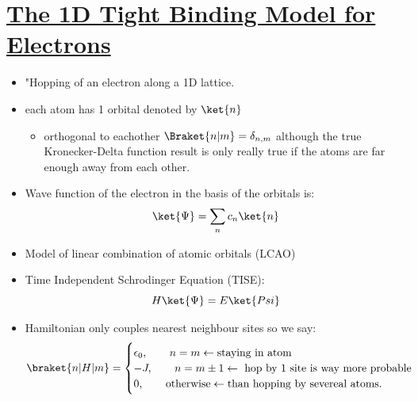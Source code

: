 \section[The 1D Tight Binding Model for Electrons]{\hyperlink{toc}{The 1D Tight Binding Model for Electrons}}


 \begin{itemize}
     \item "Hopping of an electron along a 1D lattice.
     \item each atom has 1 orbital denoted by $\ket{n}$
     \begin{itemize}
         \item orthogonal to eachother $\Braket{n|m} = \delta_{n,m}$ although the true Kronecker-Delta function result is only really true if the atoms are far enough away from each other.
     \end{itemize}
     \item Wave function of the electron in the basis of the orbitals is:
     \[\ket{\Psi} = \sum_n c_n \ket{n} \]
     \item Model of linear combination of atomic orbitals (LCAO) 
     \item Time Independent Schrodinger Equation (TISE):
     \[ H \ket{\Psi} = E \ket{Psi}\]
     \item Hamiltonian only couples nearest neighbour sites so we say:
     \[ \braket{n | H | m} = \begin{cases}
     \epsilon_0, \qquad n=m \leftarrow \text{staying in atom} \\
     -J, \qquad n=m\pm1  \leftarrow \text{ hop by 1 site is way more probable} \\
     0, \qquad \text{otherwise} \leftarrow \text{than hopping by severeal atoms.}
     \end{cases}\]
     

\end{itemize}
